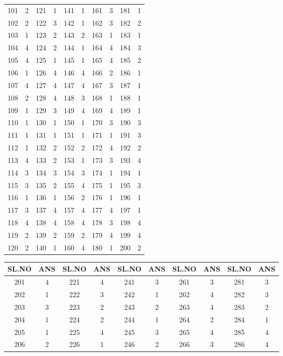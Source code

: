 {\begin{tabular}{|c|c||c|c||c|c||c|c||c|c|}
101 & 2 & 121 & 1 & 141 & 1 & 161 & 3 & 181 & 1 \\
102 & 2 & 122 & 3 & 142 & 1 & 162 & 3 & 182 & 2 \\
103 & 1 & 123 & 2 & 143 & 2 & 163 & 1 & 183 & 1 \\
104 & 4 & 124 & 2 & 144 & 1 & 164 & 4 & 184 & 3 \\
105 & 4 & 125 & 1 & 145 & 1 & 165 & 4 & 185 & 2 \\
106 & 1 & 126 & 4 & 146 & 4 & 166 & 2 & 186 & 1 \\
107 & 4 & 127 & 4 & 147 & 4 & 167 & 3 & 187 & 1 \\
108 & 2 & 128 & 4 & 148 & 3 & 168 & 1 & 188 & 1 \\
109 & 1 & 129 & 3 & 149 & 4 & 169 & 4 & 189 & 1 \\
110 & 1 & 130 & 1 & 150 & 1 & 170 & 3 & 190 & 3 \\
111 & 1 & 131 & 1 & 151 & 1 & 171 & 1 & 191 & 3 \\
112 & 1 & 132 & 2 & 152 & 2 & 172 & 4 & 192 & 2 \\
113 & 4 & 133 & 2 & 153 & 1 & 173 & 3 & 193 & 4 \\
114 & 3 & 134 & 3 & 154 & 3 & 174 & 1 & 194 & 1 \\
115 & 3 & 135 & 2 & 155 & 4 & 175 & 1 & 195 & 3 \\
116 & 1 & 136 & 1 & 156 & 2 & 176 & 1 & 196 & 1 \\
117 & 3 & 137 & 4 & 157 & 4 & 177 & 4 & 197 & 1 \\
118 & 4 & 138 & 4 & 158 & 4 & 178 & 3 & 198 & 4 \\
119 & 2 & 139 & 2 & 159 & 2 & 179 & 4 & 199 & 4 \\
120 & 2 & 140 & 1 & 160 & 4 & 180 & 1 & 200 & 2 \\
\hline
\end{tabular}\par\bigskip
\begin{tabular}{|c|c||c|c||c|c||c|c||c|c|}
\hline
SL.NO & ANS & SL.NO & ANS & SL.NO & ANS & SL.NO & ANS & SL.NO & ANS \\
\hline
201 & 4 & 221 & 4 & 241 & 3 & 261 & 3 & 281 & 3 \\
202 & 1 & 222 & 3 & 242 & 1 & 262 & 4 & 282 & 3 \\
203 & 3 & 223 & 2 & 243 & 2 & 263 & 4 & 283 & 2 \\
204 & 1 & 224 & 2 & 244 & 1 & 264 & 2 & 284 & 1 \\
205 & 1 & 225 & 4 & 245 & 3 & 265 & 4 & 285 & 4 \\
206 & 2 & 226 & 1 & 246 & 2 & 266 & 3 & 286 & 4 \\

\end{tabular}}
